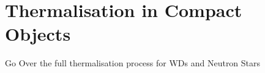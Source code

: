 \graphicspath{{img/chapter_4/}}

\chapter{Thermalisation in Compact Objects}
\label{chapter:thermalisation}

\begin{synopsis}
  Go Over the full thermalisation process for WDs and Neutron Stars
\end{synopsis}
